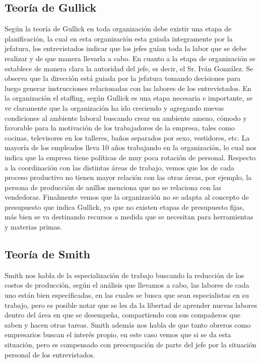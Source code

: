 
\subsection{Teoría de Gullick}
	Según la teoría de Gullick en toda organización debe existir una etapa de planificación, la cual
	en esta organización esta guiada integramente por la jefatura, los entrevistados indicar que los jefes
	guían toda la labor que se debe realizar y de que manera llevarla a cabo. En cuanto a la etapa de organización se 
	establece de manera clara la autoridad del jefe, es decir, el Sr. Iván González. Se observa que la dirección 
	está guiada por la jefatura tomando decisiones para luego generar instrucciones relacionadas con las labores
	de los entrevistados. En la organización el staffing, según Gullick es una etapa necesaria e importante, se ve
	claramente que la organización ha ido creciendo y agregando nuevas condiciones al ambiente laboral
	buscando crear un ambiente ameno, cómodo y favorable para la motivación de los trabajadores de
	la empresa, tales como cocinas, televisores en los talleres, baños separados por sexo, vestidores, etc. 
	La mayoría de los empleados lleva 10 años trabajando en la organización, lo cual nos indica que
	la empresa tiene políticas de muy poca rotación de personal. Respecto a la coordinación con las
	distintas áreas de trabajo, vemos que los de cada proceso productivo no tienen mayor relación con
	las otras áreas, por ejemplo, la persona de producción de anillos menciona que no se relaciona con las
	vendedoras. Finalmente vemos que la organización no se adapta al concepto de 
	presupuesto que indica Gullick, ya que no existen etapas de presupuesto fijas, más bien se va destinando
	recursos a medida que se necesitan para herramientas y materias primas.\\

\subsection{Teoría de Smith}
	Smith nos habla de la especialización de trabajo buscando la reducción de los costos de producción,
	según el análisis que llevamos a cabo, las labores de cada uno están bien especificadas, en las
	cuales se busca que sean especialistas en su trabajo, pero es posible notar que se les da la
	libertad de aprender nuevas labores dentro del área en que se desempeña, compartiendo con sus
	compañeros que saben y hacen otras tareas. Smith además nos habla de que tanto obreros como 
	empresarios buscan el interés propio, en este caso vemos que si se da esta situación, pero es compensado
	con preocupación de parte del jefe por la situación personal de los entrevistados. \\


